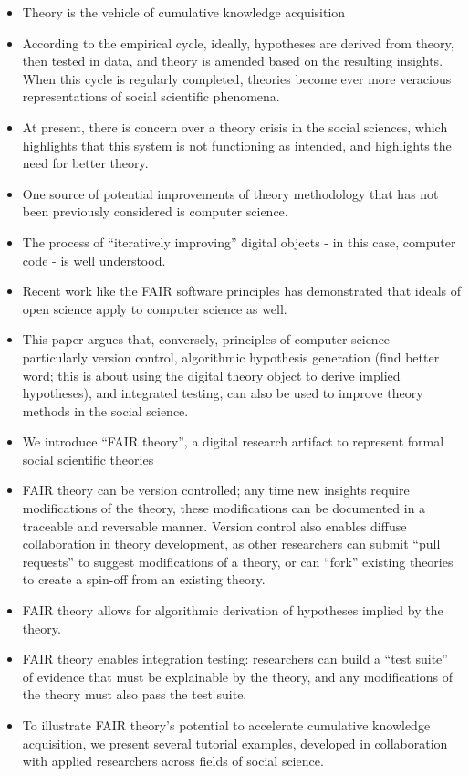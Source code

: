 \documentclass[
  man]{apa6}
\providecommand{\tightlist}{%
  \setlength{\itemsep}{0pt}\setlength{\parskip}{0pt}}
\begin{document}
\begin{itemize}
\tightlist
\item
  Theory is the vehicle of cumulative knowledge acquisition
\item
  According to the empirical cycle, ideally, hypotheses are derived from theory, then tested in data, and theory is amended based on the resulting insights. When this cycle is regularly completed, theories become ever more veracious representations of social scientific phenomena.
\item
  At present, there is concern over a theory crisis in the social sciences, which highlights that this system is not functioning as intended, and highlights the need for better theory.
\item
  One source of potential improvements of theory methodology that has not been previously considered is computer science.
\item
  The process of ``iteratively improving'' digital objects - in this case, computer code - is well understood.
\item
  Recent work like the FAIR software principles has demonstrated that ideals of open science apply to computer science as well.
\item
  This paper argues that, conversely, principles of computer science - particularly version control, algorithmic hypothesis generation (find better word; this is about using the digital theory object to derive implied hypotheses), and integrated testing, can also be used to improve theory methods in the social science.
\item
  We introduce ``FAIR theory'', a digital research artifact to represent formal social scientific theories
\item
  FAIR theory can be version controlled; any time new insights require modifications of the theory, these modifications can be documented in a traceable and reversable manner. Version control also enables diffuse collaboration in theory development, as other researchers can submit ``pull requests'' to suggest modifications of a theory, or can ``fork'' existing theories to create a spin-off from an existing theory.
\item
  FAIR theory allows for algorithmic derivation of hypotheses implied by the theory.
\item
  FAIR theory enables integration testing: researchers can build a ``test suite'' of evidence that must be explainable by the theory, and any modifications of the theory must also pass the test suite.
\item
  To illustrate FAIR theory's potential to accelerate cumulative knowledge acquisition, we present several tutorial examples, developed in collaboration with applied researchers across fields of social science.
\end{itemize}
\end{document}
